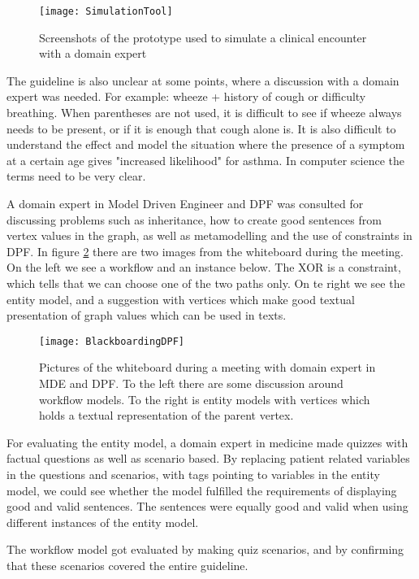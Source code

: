 \begin{figure}[h!]
	\caption {Screenshots of the prototype used to simulate a clinical encounter with a domain expert}
	\label{fig:SimulationTool}
	\texttt{[image: SimulationTool]}
\end{figure}

The guideline is also unclear at some points, where a discussion with a domain expert was needed. For example: wheeze + history of cough or difficulty breathing. When parentheses are not used, it is difficult to see if wheeze always needs to be  present, or if it is enough that cough alone is. It is also difficult to understand the effect and model the situation where the presence of a symptom at a certain age gives "increased likelihood" for asthma. In computer science the terms need to be very clear.

A domain expert in Model Driven Engineer and DPF was consulted for discussing problems such as inheritance, how to create good sentences from vertex values in the graph, as well as metamodelling and the use of constraints in DPF. In figure \ref{fig:BlackboardingDPF} there are two images from the whiteboard during the meeting. On the left we see a workflow and an instance below. The XOR is a constraint, which tells that we can choose one of the two  paths only. On te right we see the entity model, and a suggestion with vertices which make good textual presentation of graph values which can be used in texts. 
\begin{figure}[h!]
	\caption {Pictures of the whiteboard during a meeting with domain expert in MDE and DPF. To the left there are some discussion around workflow models. To the right is entity models with vertices which holds a textual representation of the parent vertex.   }
	\label{fig:BlackboardingDPF}
	\texttt{[image: BlackboardingDPF]}
\end{figure}

For evaluating the entity model, a domain expert in medicine made quizzes with factual questions as well as scenario based. By replacing patient related variables in the questions and scenarios, with tags pointing to variables in the entity model, we could see whether the model fulfilled the requirements of displaying good and valid sentences. The sentences were equally good and valid when using different instances of the entity model.

The workflow model got evaluated by making quiz scenarios, and by confirming that these scenarios covered the entire guideline.



